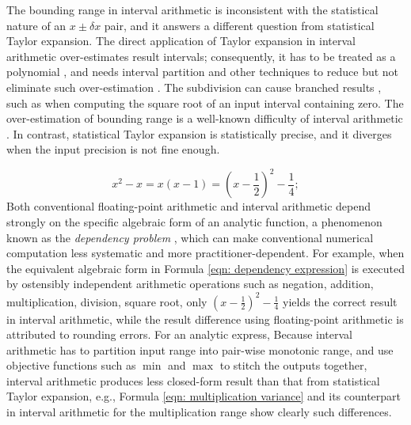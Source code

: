 \documentclass[twoside]{article}
\numberwithin{equation}{section}
\begin{document}
The bounding range in interval arithmetic \cite{Interval_Analysis, Worst_Case_Error_Bounds, Interval_Analysis_Theory_Applications, Interval_Arithmetic, Interval_Analysis_Notations} is inconsistent with the statistical nature of an $x \pm \delta x$ pair, and it answers a different question from statistical Taylor expansion.
The direct application of Taylor expansion in interval arithmetic over-estimates result intervals; consequently, it has to be treated as a polynomial \cite{Taylor_Models, Taylor_Forms_Limits}, and needs interval partition and other techniques to reduce but not eliminate such over-estimation \cite{Interval_Analysis, Interval_Analysis_Theory_Applications, Interval_Global_Optimization}.
The subdivision can cause branched results \cite{Interval_Analysis, Interval_Analysis_Theory_Applications}, such as when computing the square root of an input interval containing zero.
The over-estimation of bounding range is a well-known difficulty of interval arithmetic \cite{Interval_Global_Optimization}.
In contrast, statistical Taylor expansion is statistically precise, and it diverges when the input precision is not fine enough.

\begin{equation}
\label{eqn: dependency expression}
x^2 - x = x(x - 1) = (x - \frac{1}{2})^2 - \frac{1}{4};
\end{equation}
Both conventional floating-point arithmetic and interval arithmetic depend strongly on the specific algebraic form of an analytic function, a phenomenon known as the \emph{dependency problem} \cite{Precise_Numerical_Methods, Algorithms_Accuracy, Interval_Analysis, Interval_Analysis_Theory_Applications}, which can make conventional numerical computation less systematic and more practitioner-dependent.
For example, when the equivalent algebraic form in Formula \eqref{eqn: dependency expression} is executed by ostensibly independent arithmetic operations such as negation, addition, multiplication, division, square root, only $(x - \frac{1}{2})^2 - \frac{1}{4}$ yields the correct result in interval arithmetic, while the result difference using floating-point arithmetic is attributed to rounding errors.
For an analytic express, Because interval arithmetic has to partition input range into pair-wise monotonic range, and use objective functions such as $\min$ and $\max$ to stitch the outputs together, interval arithmetic produces less closed-form result than that from statistical Taylor expansion, e.g., Formula \eqref{eqn: multiplication variance} and its counterpart in interval arithmetic for the multiplication range show clearly such differences.
\end{document}
